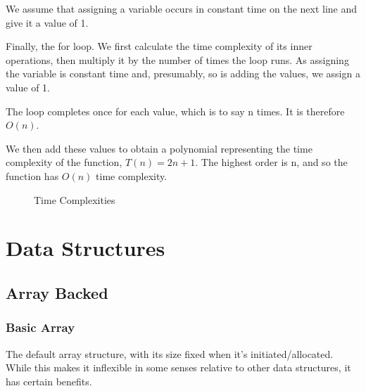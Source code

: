 \documentclass[]{article}
\begin{document}
We assume that assigning a variable occurs in constant time on the next line and give it a value of 1.

Finally, the for loop. We first calculate the time complexity of its inner operations, then multiply it by the number of times the loop runs. As assigning the variable is constant time and, presumably, so is adding the values, we assign a value of 1.

The loop completes once for each value, which is to say n times. It is therefore $O(n)$.

We then add these values to obtain a polynomial representing the time complexity of the function, $T(n) = 2n + 1$. The highest order is n, and so the function has $O(n)$ time complexity.

\begin{figure}
\centering
\caption{Time Complexities}
\label{fig:time}
\end{figure}

\pagebreak

\section{Data Structures}

\subsection{Array Backed}

\subsubsection{Basic Array}

The default array structure, with its size fixed when it's initiated/allocated. While this makes it inflexible in some senses relative to other data structures, it has certain benefits.
\end{document}
